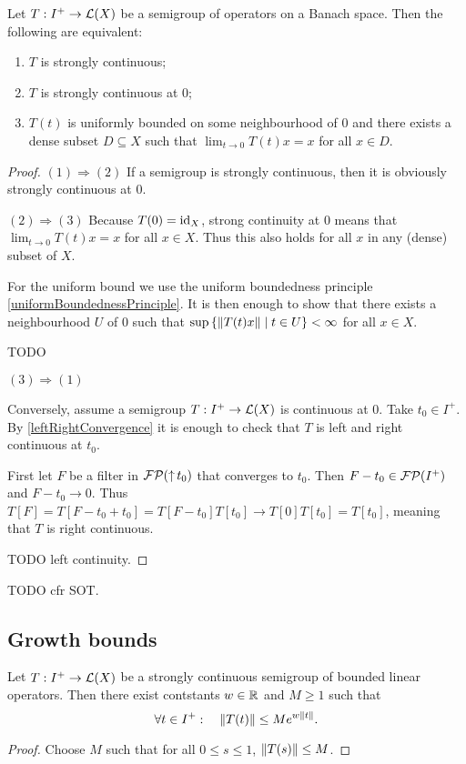 \begin{proposition}
Let $T:I^+\to \operatorname{\mathcal{L}}(X)$ be a semigroup of operators on a Banach space. Then the following are equivalent:
\begin{enumerate}
\item $T$ is strongly continuous;
\item $T$ is strongly continuous at $0$;
\item $T(t)$ is uniformly bounded on some neighbourhood of $0$ and there exists a dense subset $D\subseteq X$ such that $\lim_{t\to 0} T(t)x = x$ for all $x\in D$.
\end{enumerate}
\end{proposition}
\begin{proof}
$(1) \Rightarrow (2)$ If a semigroup is strongly continuous, then it is obviously strongly continuous at $0$.

$(2) \Rightarrow (3)$ Because $T(0) = \operatorname{id}_X$, strong continuity at $0$ means that $\lim_{t\to 0} T(t)x = x$ for all $x\in X$. Thus this also holds for all $x$ in any (dense) subset of $X$.

For the uniform bound we use the uniform boundedness principle \ref{uniformBoundednessPrinciple}. It is then enough to show that there exists a neighbourhood $U$ of $0$ such that $\sup\left\{ \lVert T(t)x\rVert \;\middle|\; t\in U \right\} <\infty$ for all $x\in X$.

TODO

$(3) \Rightarrow (1)$

Conversely, assume a semigroup $T: I^+\to \operatorname{\mathcal{L}}(X)$ is continuous at $0$. Take $t_0\in I^+$. By \ref{leftRightConvergence} it is enough to check that $T$ is left and right continuous at $t_0$.

First let $F$ be a filter in $\operatorname{\mathcal{FP}}(\operatorname{\uparrow} t_0)$ that converges to $t_0$. Then $F - t_0 \in \operatorname{\mathcal{FP}}(I^+)$ and $F-t_0 \to 0$. Thus $T[F] = T[F-t_0 + t_0] = T[F-t_0]T[t_0] \to T[0]T[t_0] = T[t_0]$, meaning that $T$ is right continuous.

TODO left continuity.
\end{proof}
TODO cfr SOT.

\subsection{Growth bounds}
\begin{proposition}
Let $T: I^+ \to \operatorname{\mathcal{L}}(X)$ be a strongly continuous semigroup of bounded linear operators. Then there exist contstants $w\in \mathbb{R}$ and $M\geq 1$ such that
\[ \forall t\in I^+:\quad \lVert T(t)\rVert \leq Me^{w\lVert t\rVert}. \]
\end{proposition}
\begin{proof}
Choose $M$ such that for all $0\leq s\leq 1$, $\lVert T(s)\rVert\leq M$.
\end{proof}

